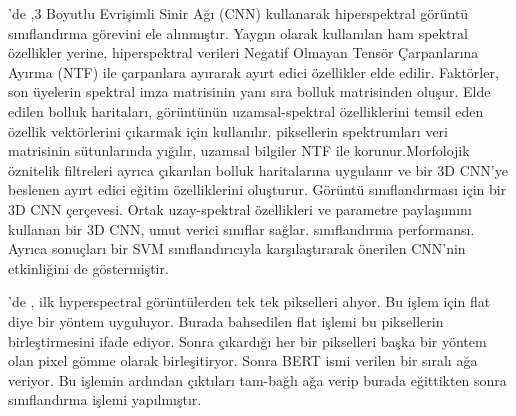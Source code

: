 \citep{mirzaei2019hyperspectral} 'de ,3 Boyutlu Evrişimli Sinir Ağı (CNN) kullanarak hiperspektral görüntü sınıflandırma görevini ele alınmıştır. Yaygın olarak kullanılan ham spektral özellikler yerine, hiperspektral verileri Negatif Olmayan Tensör Çarpanlarına Ayırma (NTF) ile çarpanlara ayırarak ayırt edici özellikler elde edilir. Faktörler, son üyelerin spektral imza matrisinin yanı sıra bolluk matrisinden oluşur. Elde edilen bolluk haritaları, görüntünün uzamsal-spektral özelliklerini temsil eden özellik vektörlerini çıkarmak için kullanılır. piksellerin spektrumları veri matrisinin sütunlarında yığılır, uzamsal bilgiler NTF ile korunur.Morfolojik öznitelik filtreleri ayrıca çıkarılan bolluk haritalarına uygulanır ve bir 3D CNN'ye beslenen ayırt edici eğitim özelliklerini oluşturur. Görüntü sınıflandırması için bir 3D CNN çerçevesi. Ortak uzay-spektral özellikleri ve parametre paylaşımını kullanan bir 3D CNN, umut verici sınıflar sağlar. sınıflandırma performansı. Ayrıca sonuçları bir SVM sınıflandırıcıyla karşılaştırarak önerilen CNN'nin etkinliğini de göstermiştir.

\citep{he2019hsi} 'de , ilk hyperspectral görüntülerden tek tek pikselleri alıyor. Bu işlem için flat diye bir yöntem uyguluyor. Burada bahsedilen flat işlemi bu piksellerin birleştirmesini ifade ediyor. Sonra çıkardığı her bir pikselleri  başka bir yöntem olan pixel gömme olarak birleşitiryor.  Sonra BERT ismi verilen bir sıralı ağa veriyor. Bu işlemin ardından çıktıları tam-bağlı ağa verip burada eğittikten sonra sınıflandırma işlemi yapılmıştır. 

\newpage

